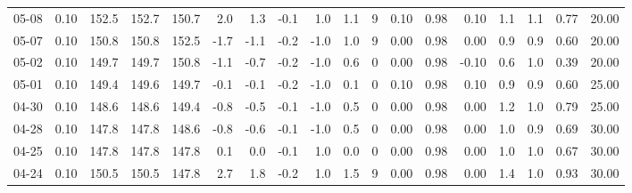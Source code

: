 \begin{threeparttable}
{\begin{tabular}{lrrrrrrrrrrrrrrrrr}
  05-08 &     0.10 & 152.5 & 152.7 & 150.7 &        2.0 &            1.3 &                      -0.1 &                      1.0 &                 1.1 &              9 &       0.10 &      0.98 &           0.10 &              1.1 &                 1.1 &            0.77 &                  20.00 \\
  05-07 &     0.10 & 150.8 & 150.8 & 152.5 &       -1.7 &           -1.1 &                      -0.2 &                     -1.0 &                 1.0 &              9 &       0.00 &      0.98 &           0.00 &              0.9 &                 0.9 &            0.60 &                  20.00 \\
  05-02 &     0.10 & 149.7 & 149.7 & 150.8 &       -1.1 &           -0.7 &                      -0.2 &                     -1.0 &                 0.6 &              0 &       0.00 &      0.98 &          -0.10 &              0.6 &                 1.0 &            0.39 &                  20.00 \\
  05-01 &     0.10 & 149.4 & 149.6 & 149.7 &       -0.1 &           -0.1 &                      -0.2 &                     -1.0 &                 0.1 &              0 &       0.10 &      0.98 &           0.10 &              0.9 &                 0.9 &            0.60 &                  25.00 \\
  04-30 &     0.10 & 148.6 & 148.6 & 149.4 &       -0.8 &           -0.5 &                      -0.1 &                     -1.0 &                 0.5 &              0 &       0.00 &      0.98 &           0.00 &              1.2 &                 1.0 &            0.79 &                  25.00 \\
  04-28 &     0.10 & 147.8 & 147.8 & 148.6 &       -0.8 &           -0.6 &                      -0.1 &                     -1.0 &                 0.5 &              0 &       0.00 &      0.98 &           0.00 &              1.0 &                 0.9 &            0.69 &                  30.00 \\
  04-25 &     0.10 & 147.8 & 147.8 & 147.8 &        0.1 &            0.0 &                      -0.1 &                      1.0 &                 0.0 &              0 &       0.00 &      0.98 &           0.00 &              1.0 &                 1.0 &            0.67 &                  30.00 \\
  04-24 &     0.10 & 150.5 & 150.5 & 147.8 &        2.7 &            1.8 &                      -0.2 &                      1.0 &                 1.5 &              9 &       0.00 &      0.98 &           0.00 &              1.4 &                 1.0 &            0.93 &                  30.00 \\

\end{tabular}}
\end{threeparttable}
